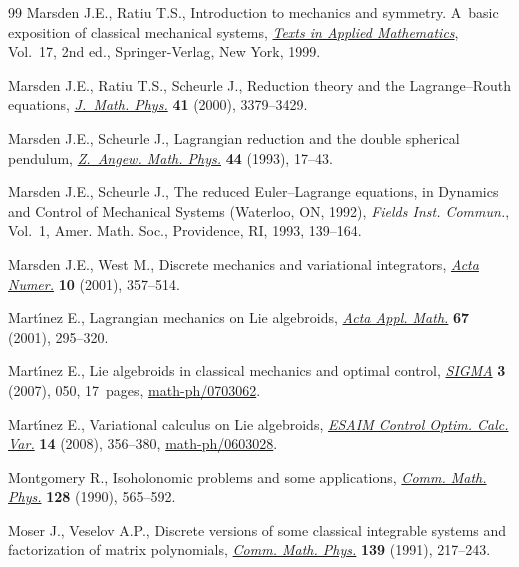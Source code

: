 \begin{thebibliography}{99}
Marsden J.E., Ratiu T.S., Introduction to mechanics and symmetry. A~basic
 exposition of classical mechanical systems, \href{https://doi.org/10.1007/978-0-387-21792-5}{\textit{Texts in Applied
 Mathematics}}, Vol.~17, 2nd ed., Springer-Verlag, New York, 1999.

Marsden J.E., Ratiu T.S., Scheurle J., Reduction theory and the
 {L}agrange--{R}outh equations, \href{https://doi.org/10.1063/1.533317}{\textit{J.~Math. Phys.}} \textbf{41} (2000),
 3379--3429.

Marsden J.E., Scheurle J., Lagrangian reduction and the double spherical
 pendulum, \href{https://doi.org/10.1007/BF00914351}{\textit{Z.~Angew. Math. Phys.}} \textbf{44} (1993), 17--43.

Marsden J.E., Scheurle J., The reduced {E}uler--{L}agrange equations, in
 Dynamics and Control of Mechanical Systems ({W}aterloo, {ON}, 1992),
 \textit{Fields Inst. Commun.}, Vol.~1, Amer. Math. Soc., Providence, RI,
 1993, 139--164.

Marsden J.E., West M., Discrete mechanics and variational integrators,
 \href{https://doi.org/10.1017/S096249290100006X}{\textit{Acta Numer.}} \textbf{10} (2001), 357--514.

Mart\'{\i}nez E., Lagrangian mechanics on {L}ie algebroids, \href{https://doi.org/10.1023/A:1011965919259}{\textit{Acta Appl.
 Math.}} \textbf{67} (2001), 295--320.

Mart\'{\i}nez E., Lie algebroids in classical mechanics and optimal control,
 \href{https://doi.org/10.3842/SIGMA.2007.050}{\textit{SIGMA}} \textbf{3} (2007), 050, 17~pages, \href{http://arxiv.org/abs/math-ph/0703062}{math-ph/0703062}.

Mart\'{\i}nez E., Variational calculus on {L}ie algebroids, \href{https://doi.org/10.1051/cocv:2007056}{\textit{ESAIM
 Control Optim. Calc. Var.}} \textbf{14} (2008), 356--380,
 \href{http://arxiv.org/abs/math-ph/0603028}{math-ph/0603028}.

Montgomery R., Isoholonomic problems and some applications, \href{https://doi.org/10.1007/BF02096874}{\textit{Comm. Math.
 Phys.}} \textbf{128} (1990), 565--592.

Moser J., Veselov A.P., Discrete versions of some classical integrable systems
 and factorization of matrix polynomials, \href{https://doi.org/10.1007/BF02352494}{\textit{Comm. Math. Phys.}}
 \textbf{139} (1991), 217--243.


\end{thebibliography}
